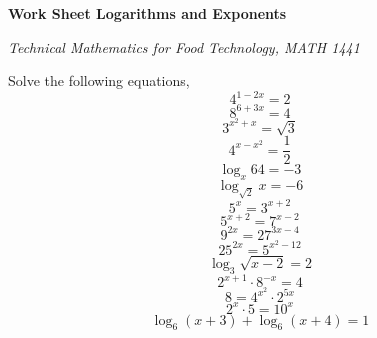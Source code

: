 \documentclass[11pt]{article}
\newcommand{\CourseName}{Technical Mathematics for Food Technology}
\newcommand{\CourseNumber}{1441}
\newcommand{\CourseName}{Technical Mathematics for Geomatics}
\newcommand{\CourseNumber}{1511}
\begin{document}
\textbf{Work Sheet Logarithms and Exponents}

\emph{\CourseName, MATH \CourseNumber}

Solve the following equations,
  \begin{equation}
    \label{eq:rohkiine}
    4^{1-2x}=2
  \end{equation}
  \begin{equation}
    \label{eq:zahsuini}
    8^{6+3x}=4
  \end{equation}
  \begin{equation}
    \label{eq:iaphaeya}
    3^{x^{2}+x}=\sqrt{3}
  \end{equation}
  \begin{equation}
    \label{eq:iebaiviu}
    4^{x-x^{2}}=\frac{1}{2}
  \end{equation}
  \begin{equation}
    \label{eq:maareiju}
    \log_{x}64=-3
  \end{equation}
  \begin{equation}
    \label{eq:sheuroov}
    \log_{\sqrt{2}}x=-6
  \end{equation}
  \begin{equation}
    \label{eq:dairithe}
    5^{x}=3^{x+2}
  \end{equation}
  \begin{equation}
    \label{eq:seizieng}
    5^{x+2}=7^{x-2}
  \end{equation}
  \begin{equation}
    \label{eq:ceivapuw}
    9^{2x}=27^{3x-4}
  \end{equation}
  \begin{equation}
    \label{eq:eefohvoh}
    25^{2x}=5^{x^{2}-12}
  \end{equation}
  \begin{equation}
    \label{eq:xiefepib}
    \log_{3}\sqrt{x-2}=2
  \end{equation}
  \begin{equation}
    \label{eq:eegaifah}
    2^{x+1}\cdot{}8^{-x}=4
  \end{equation}
  \begin{equation}
    \label{eq:phahmobu}
    8=4^{x^{2}}\cdot{}2^{5x}
  \end{equation}
  \begin{equation}
    \label{eq:xonguoge}
    2^{x}\cdot{}5=10^{x}
  \end{equation}
  \begin{equation}
    \label{eq:aeshaite}
    \log_{6}(x+3)+\log_{6}(x+4)=1
  \end{equation}
\end{document}
